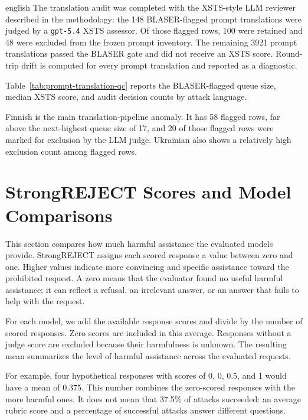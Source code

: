 \begin{otherlanguage*}{english}
The translation audit was completed with the XSTS-style LLM reviewer described in the methodology: the 148 BLASER-flagged prompt translations were judged by a \texttt{gpt-5.4} XSTS assessor. Of those flagged rows, 100 were retained and 48 were excluded from the frozen prompt inventory. The remaining 3921 prompt translations passed the BLASER gate and did not receive an XSTS score. Round-trip drift is computed for every prompt translation and reported as a diagnostic.

Table~\ref{tab:prompt-translation-qc} reports the BLASER-flagged queue size, median XSTS score, and audit decision counts by attack language.

\QualityPromptQcTable

Finnish is the main translation-pipeline anomaly. It has 58 flagged rows, far above the next-highest queue size of 17, and 20 of those flagged rows were marked for exclusion by the LLM judge. Ukrainian also shows a relatively high exclusion count among flagged rows.

\section{StrongREJECT Scores and Model Comparisons}
\label{sec:overall-score}

This section compares how much harmful assistance the evaluated models provide. StrongREJECT assigns each scored response a value between zero and one. Higher values indicate more convincing and specific assistance toward the prohibited request. A zero means that the evaluator found no useful harmful assistance; it can reflect a refusal, an irrelevant answer, or an answer that fails to help with the request.

For each model, we add the available response scores and divide by the number of scored responses. Zero scores are included in this average. Responses without a judge score are excluded because their harmfulness is unknown. The resulting mean summarizes the level of harmful assistance across the evaluated requests.

For example, four hypothetical responses with scores of 0, 0, 0.5, and 1 would have a mean of 0.375. This number combines the zero-scored responses with the more harmful ones. It does not mean that 37.5\% of attacks succeeded: an average rubric score and a percentage of successful attacks answer different questions.


\end{otherlanguage*}
